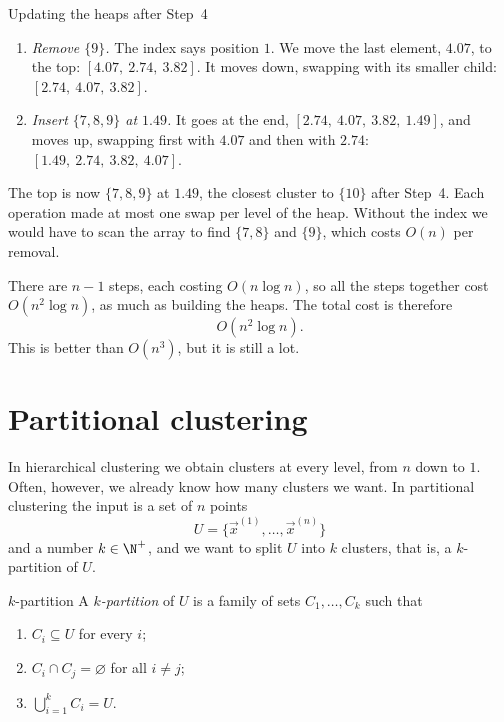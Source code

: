 \documentclass[a4paper,12pt,oneside]{report}
\begin{document}
{\begin{framedexample}{Updating the heaps after Step~4}
\begin{enumerate}
    We move the last element, $\{5,6\}$ at $2.74$, there and shorten
    the array: $[1.51,\ 2.74,\ 3.82,\ 4.07]$. Its child, $4.07$, is
    larger, so it stays.
  \item \emph{Remove $\{9\}$.} The index says position $1$. We move
    the last element, $4.07$, to the top: $[4.07,\ 2.74,\ 3.82]$. It
    moves down, swapping with its smaller child:
    $[2.74,\ 4.07,\ 3.82]$.
  \item \emph{Insert $\{7,8,9\}$ at $1.49$.} It goes at the end,
    $[2.74,\ 4.07,\ 3.82,\ 1.49]$, and moves up, swapping first with
    $4.07$ and then with $2.74$: $[1.49,\ 2.74,\ 3.82,\ 4.07]$.
\end{enumerate}
The top is now $\{7,8,9\}$ at $1.49$, the closest cluster to $\{10\}$
after Step~4. Each operation made at most one swap per level of the
heap. Without the index we would have to scan the array to find
$\{7,8\}$ and $\{9\}$, which costs $O(n)$ per removal.
\end{framedexample}}

There are $n-1$ steps, each costing $O(n\log n)$, so all the steps
together cost $O(n^2\log n)$, as much as building the heaps. The total
cost is therefore
\[
  O(n^2\log n).
\]
This is better than $O(n^3)$, but it is still a lot.

\section{Partitional clustering}

In hierarchical clustering we obtain clusters at every level, from $n$
down to $1$. Often, however, we already know how many clusters we
want. In partitional clustering the input is a set of $n$ points
\[
  U=\{\vec x^{(1)},\ldots,\vec x^{(n)}\}
\]
and a number $k\in\N^{+}$, and we want to split $U$ into $k$
clusters, that is, a $k$-partition of $U$.

\begin{frameddefn}{$k$-partition}\label{def:k-partition}
A \emph{$k$-partition} of $U$ is a family of sets $C_1,\ldots,C_k$
such that
\begin{enumerate}
  \item $C_i\subseteq U$ for every $i$;
  \item $C_i\cap C_j=\varnothing$ for all $i\neq j$;
  \item $\bigcup_{i=1}^{k}C_i=U$.
\end{enumerate}
\end{frameddefn}
\end{document}
